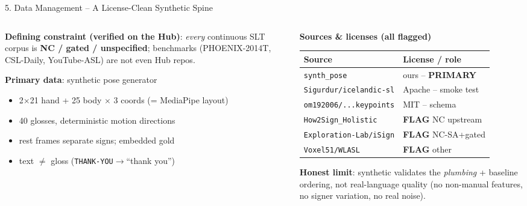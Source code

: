 \documentclass[10pt,aspectratio=169]{beamer}
\begin{document}
\begin{frame}{5. Data Management -- A License-Clean Synthetic Spine}
\begin{columns}[T]
\begin{column}{0.5\textwidth}
\textbf{Defining constraint (verified on the Hub)}: \emph{every} continuous SLT corpus is \textbf{NC / gated / unspecified}; benchmarks (PHOENIX-2014T, CSL-Daily, YouTube-ASL) are not even Hub repos.

\vspace{0.1cm}
\textbf{Primary data}: synthetic pose generator
\begin{itemize}\small
  \item 2$\times$21 hand + 25 body $\times$ 3 coords (= MediaPipe layout)
  \item 40 glosses, deterministic motion directions
  \item rest frames separate signs; embedded gold
  \item text $\neq$ gloss (\texttt{THANK-YOU}$\rightarrow$``thank you'')
\end{itemize}
\end{column}
\begin{column}{0.5\textwidth}
\textbf{Sources \& licenses (all flagged)}
\begin{table}[h]
\centering\scriptsize
\begin{tabular}{ll}
\toprule
\textbf{Source} & \textbf{License / role} \\
\midrule
\texttt{synth\_pose} & ours -- \textbf{PRIMARY} \\
\texttt{Sigurdur/icelandic-sl} & Apache -- smoke test \\
\texttt{om192006/...keypoints} & MIT -- schema \\
\texttt{How2Sign\_Holistic} & \textbf{FLAG} NC upstream \\
\texttt{Exploration-Lab/iSign} & \textbf{FLAG} NC-SA+gated \\
\texttt{Voxel51/WLASL} & \textbf{FLAG} other \\
\bottomrule
\end{tabular}
\end{table}
\scriptsize \textbf{Honest limit}: synthetic validates the \emph{plumbing} + baseline ordering, not real-language quality (no non-manual features, no signer variation, no real noise).
\end{column}
\end{columns}
\end{frame}
\end{document}
